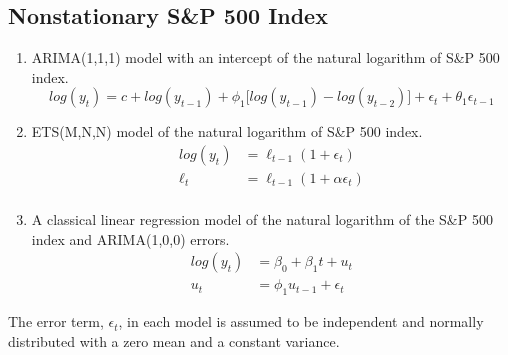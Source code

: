 \documentclass{monashthesis}
\begin{document}
\hypertarget{nonstationary-sp-500-index}{%
\subsection{Nonstationary S\&P 500 Index}\label{nonstationary-sp-500-index}}

\begin{enumerate}
\def\labelenumi{\arabic{enumi}.}
\item
  ARIMA(1,1,1) model with an intercept of the natural logarithm of S\&P 500 index.
  \begin{equation*}
  log(y_t) = c + log(y_{t-1}) + \phi_1\big[log(y_{t-1})-log(y_{t-2})\big] + \epsilon_t + \theta_1\epsilon_{t-1}
  \end{equation*}
\item
  ETS(M,N,N) model of the natural logarithm of S\&P 500 index.
  \begin{align*}
  log(y_t) &= \ell_{t-1} (1+\epsilon_t) \\
  \ell_t &= \ell_{t-1} (1+\alpha \epsilon_t) \\
  \end{align*}
\item
  A classical linear regression model of the natural logarithm of the S\&P 500 index and ARIMA(1,0,0) errors.
  \begin{align*}
  log(y_t) &= \beta_0 + \beta_1 t + u_t \\
  u_t &= \phi_1 u_{t-1} + \epsilon_t
  \end{align*}
\end{enumerate}

The error term, \(\epsilon_t\), in each model is assumed to be independent and normally distributed with a zero mean and a constant variance.

\printbibliography[title={Reference}]
\end{document}
